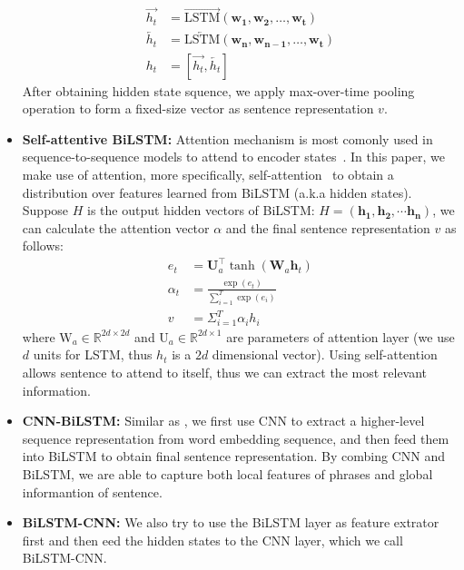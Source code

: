 \documentclass[11pt,a4paper]{article}
\begin{document}
\begin{itemize}
\begin{equation}
\begin{aligned}
  		\overrightarrow{h_{t}}&=\overrightarrow{\mathrm{LSTM}}\left(\mathbf{w_{1}}, \mathbf{w_{2}}, \ldots, \mathbf{w_{t}}\right)    \\
  		\overleftarrow{h_{t}}&=\overleftarrow{\mathrm{LSTM}}\left(\mathbf{w_{n}}, \mathbf{w_{n-1}}, \ldots, \mathbf{w_{t}}\right)     \\
  		 h_{t}&=\left[\overrightarrow{h_{t}}, \overleftarrow{h_{t}}\right]
  	\end{aligned}
\end{equation}	
After obtaining hidden state squence, we apply max-over-time pooling operation to form a fixed-size vector as sentence representation $v$.
	\item \textbf{Self-attentive BiLSTM:} Attention mechanism is most comonly used in sequence-to-sequence models to attend to encoder states~\cite{DBLP:journals/corr/BahdanauCB14, DBLP:journals/corr/VaswaniSPUJGKP17}. In this paper, we make use of attention, more specifically, self-attention~\cite{DBLP:journals/corr/LinFSYXZB17} to obtain a distribution over features learned from BiLSTM (a.k.a hidden states). Suppose $H$ is the output hidden vectors of BiLSTM: $H=\left(\mathbf{h}_{\mathbf{1}}, \mathbf{h}_{\mathbf{2}}, \cdots \mathbf{h}_{\mathbf{n}}\right)$, we can calculate the attention vector $\alpha$ and the final sentence representation $v$ as follows:
\begin{equation}
\begin{aligned}
  		e_{t}&=\mathbf{U}_{a}^{\top} \tanh \left(\mathbf{W}_{a} \mathbf{h}_{t}\right)    \\
  		\alpha_{t}&=\frac{\exp \left(e_{t}\right)}{\sum_{i=1}^{T} \exp \left(e_{i}\right)}     \\
  		 v&=\Sigma_{i=1}^{T} \alpha_{i} h_{i}
\end{aligned}
\end{equation}
where $\mathrm{W}_{a} \in \mathbb{R}^{2d \times 2d}$ and $\mathrm{U}_{a} \in \mathbb{R}^{2d \times 1}$ are parameters of attention layer (we use $d$ units for LSTM, thus ${h_{t}}$ is a $2d$ dimensional vector).  Using self-attention allows sentence to attend to itself, thus we can extract the most relevant information.
	\item \textbf{CNN-BiLSTM:} Similar as \cite{DBLP:journals/corr/ZhouSLL15b}, we first use CNN to extract a higher-level sequence representation from word embedding sequence, and then feed them into BiLSTM to obtain final sentence representation. By combing CNN and BiLSTM, we are able to capture both local features of phrases and global informantion of sentence. 
	\item \textbf{BiLSTM-CNN:} We also try to use the BiLSTM layer as feature extrator first and then eed the hidden states to the CNN layer, which we call BiLSTM-CNN.
\end{itemize}
\end{document}
